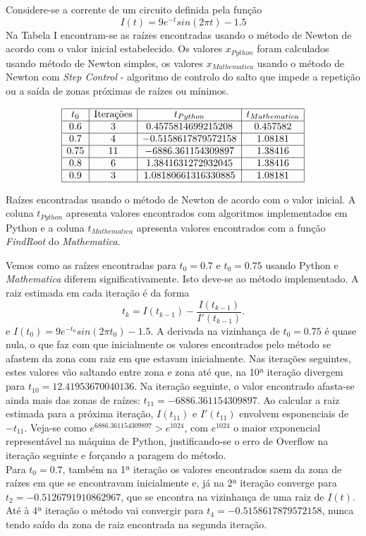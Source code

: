 \documentclass[aps,pre,twocolumn,showpacs,amsmath,amssymb]{revtex4-1}
\begin{document}
Considere-se a corrente de um circuito definida pela função
\begin{equation}
    I(t)=9e^{-t}sin(2\pi t)-1.5
\end{equation}
Na Tabela I encontram-se as raízes encontradas usando o método de Newton de acordo com o valor inicial estabelecido. Os valores $x_{Python}$ foram calculados usando método de Newton simples, os valores $x_{Mathematica}$ usando o método de Newton com \textit{Step Control} - algoritmo de controlo do salto que impede a repetição ou a saída de zonas próximas de raízes ou mínimos.
\begin{table} [h]
  $$\begin{array}{|c|c|c|c|} \hline
  t_0 & \text{Iterações} & t_{Python} & t_{Mathematica} \\ \hline
  0.6 & 3 & 0.4575814699215208 & 0.457582 \\ \hline
  0.7 & 4 & -0.5158617879572158 & 1.08181 \\ \hline
  0.75 & 11 & -6886.361154309897 & 1.38416 \\ \hline
  0.8 & 6 & 1.3841631272932045 & 1.38416  \\ \hline
  0.9 & 3 & 1.08180661316330885 &  1.08181 \\ \hline
\end{array}$$
  \caption{Raízes encontradas usando o método de Newton de acordo com o valor inicial. A coluna $t_{Python}$ apresenta valores encontrados com algoritmos implementados em Python e a coluna $t_{Mathematica}$ apresenta valores encontrados com a função \textit{FindRoot} do \textit{Mathematica}.}
\end{table}
Vemos como as raízes encontradas para $t_0=0.7$ e $t_0=0.75$ usando Python e \textit{Mathematica} diferem significativamente. Isto deve-se ao método implementado. A raiz estimada em cada iteração é da forma
\begin{equation}
    t_k = I(t_{k-1}) - \frac{I(t_{k-1})}{I'(t_{k-1})}.
\end{equation}
e $I(t_0)=9e^{-t_0}sin(2\pi t_0)-1.5$. A derivada na vizinhança de $t_0=0.75$ é quase nula, o que faz com que
inicialmente os valores encontrados pelo método se afastem da zona com raiz em que estavam inicialmente. Nas iterações seguintes, estes valores vão saltando entre zona e zona até que, na 10ª iteração divergem para $t_{10}=12.41953670040136$. Na iteração seguinte, o valor encontrado afasta-se ainda mais das zonas de raízes: $t_{11}=-6886.361154309897$. Ao calcular a raiz estimada para a próxima iteração, $I(t_{11})$ e $I'(t_{11})$ envolvem esponenciais de $-t_{11}$. Veja-se como $e^{6886.361154309897}>e^{1024}$, com $e^{1024}$ o maior exponencial representável na máquina de Python, justificando-se o erro de Overflow na iteração seguinte e forçando a paragem do método.\\
Para $t_0=0.7$, também na 1ª iteração os valores encontrados saem da zona de raízes em que se encontravam inicialmente e, já na 2ª iteração converge para $t_2= -0.5126791910862967$, que se encontra na vizinhança de uma raiz de $I(t)$. Até à 4ª iteração o método vai convergir para $t_4=-0.5158617879572158$, nunca tendo saído da zona de raiz encontrada na segunda iteração.
\end{document}
